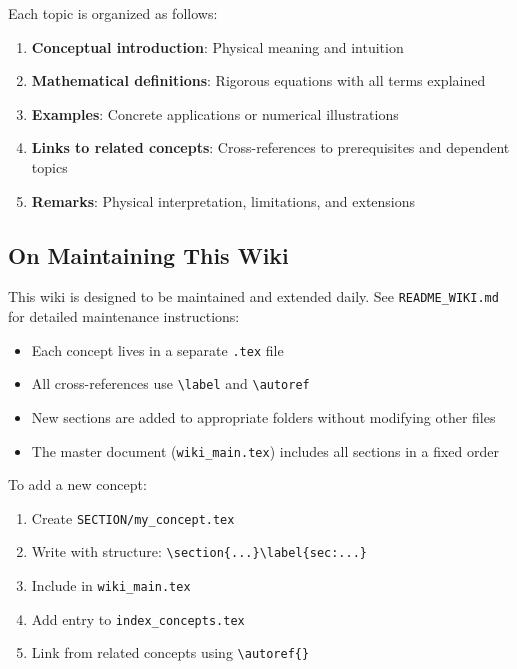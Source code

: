 Each topic is organized as follows:

\begin{enumerate}
    \item \textbf{Conceptual introduction}: Physical meaning and intuition
    \item \textbf{Mathematical definitions}: Rigorous equations with all terms explained
    \item \textbf{Examples}: Concrete applications or numerical illustrations
    \item \textbf{Links to related concepts}: Cross-references to prerequisites and dependent topics
    \item \textbf{Remarks}: Physical interpretation, limitations, and extensions
\end{enumerate}

\subsection{On Maintaining This Wiki}\label{subsec:intro_maintain}

This wiki is designed to be maintained and extended daily. See \texttt{README\_WIKI.md} for detailed maintenance instructions:

\begin{itemize}
    \item Each concept lives in a separate \texttt{.tex} file
    \item All cross-references use \texttt{\textbackslash label} and \texttt{\textbackslash autoref}
    \item New sections are added to appropriate folders without modifying other files
    \item The master document (\texttt{wiki\_main.tex}) includes all sections in a fixed order
\end{itemize}

To add a new concept:
\begin{enumerate}
    \item Create \texttt{SECTION/my\_concept.tex}
    \item Write with structure: \texttt{\textbackslash section\{...\}\textbackslash label\{sec:...\}}
    \item Include in \texttt{wiki\_main.tex}
    \item Add entry to \texttt{index\_concepts.tex}
    \item Link from related concepts using \texttt{\textbackslash autoref\{\}}
\end{enumerate}

